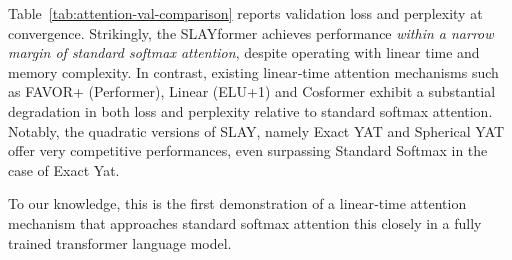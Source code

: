 \documentclass{article}
\begin{document}
Table~\ref{tab:attention-val-comparison} reports validation loss and perplexity at convergence.
Strikingly, the SLAYformer achieves performance \emph{within a narrow margin of standard softmax attention},
despite operating with linear time and memory complexity.
In contrast, existing linear‑time attention mechanisms such as FAVOR+ (Performer), Linear (ELU+1) and Cosformer exhibit a
substantial degradation in both loss and perplexity relative to standard softmax attention. Notably, the quadratic versions of SLAY, namely Exact YAT and Spherical YAT offer very competitive performances, even surpassing Standard Softmax in the case of Exact Yat. 

To our knowledge, this is the first demonstration of a linear‑time attention mechanism that approaches
standard softmax attention this closely in a fully trained transformer language model.
\end{document}

